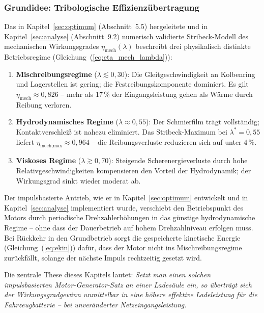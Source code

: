 ﻿\documentclass[a4paper,12pt]{article}
\begin{document}
\subsubsection{Grundidee: Tribologische Effizienzübertragung}

Das in Kapitel~\ref{sec:optimum} (Abschnitt~5.5) hergeleitete und in
Kapitel~\ref{sec:analyse} (Abschnitt~9.2) numerisch validierte Stribeck-Modell
des mechanischen Wirkungsgrades $\eta_\text{mech}(\lambda)$ beschreibt
drei physikalisch distinkte Betriebsregime (Gleichung~(\ref{eq:eta_mech_lambda})):

\begin{enumerate}
  \item \textbf{Mischreibungsregime} ($\lambda \lesssim 0{,}30$):
    Die Gleitgeschwindigkeit an Kolbenring und Lagerstellen ist gering;
    die Festreibungskomponente dominiert. Es gilt
    $\eta_\text{mech} \approx 0{,}826$ -- mehr als 17\,\% der Eingangsleistung
    gehen als Wärme durch Reibung verloren.

  \item \textbf{Hydrodynamisches Regime} ($\lambda \approx 0{,}55$):
    Der Schmierfilm trägt vollständig; Kontaktverschleiß ist nahezu
    eliminiert. Das Stribeck-Maximum bei $\lambda^* = 0{,}55$ liefert
    $\eta_\text{mech,max} \approx 0{,}964$ -- die Reibungsverluste
    reduzieren sich auf unter 4\,\%.

  \item \textbf{Viskoses Regime} ($\lambda \gtrsim 0{,}70$):
    Steigende Scherenergieverluste durch hohe Relativgeschwindigkeiten
    kompensieren den Vorteil der Hydrodynamik; der Wirkungsgrad sinkt
    wieder moderat ab.
\end{enumerate}

Der impulsbasierte Antrieb, wie er in Kapitel~\ref{sec:optimum} entwickelt
und in Kapitel~\ref{sec:analyse} implementiert wurde, verschiebt den
Betriebspunkt des Motors durch periodische Drehzahlerhöhungen in das
günstige hydrodynamische Regime -- ohne dass der Dauerbetrieb
auf hohem Drehzahlniveau erfolgen muss. Bei Rückkehr in den
Grundbetrieb sorgt die gespeicherte kinetische Energie
(Gleichung~(\ref{eq:ekin})) dafür, dass der Motor nicht ins
Mischreibungsregime zurückfällt, solange der nächste Impuls rechtzeitig
gesetzt wird.

Die zentrale These dieses Kapitels lautet: \textit{Setzt man einen
solchen impulsbasierten Motor-Generator-Satz an einer Ladesäule ein,
so überträgt sich der Wirkungsgradgewinn unmittelbar in eine höhere
effektive Ladeleistung für die Fahrzeugbatterie -- bei unveränderter
Netzeingangsleistung.}
\end{document}
